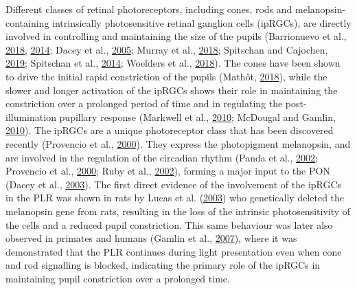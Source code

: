 \documentclass[
]{article}
\begin{document}
Different classes of retinal photoreceptors, including cones, rods and melanopsin-containing intrinsically photosensitive retinal ganglion cells (ipRGCs), are directly involved in controlling and maintaining the size of the pupils (Barrionuevo et al., \protect\hyperlink{ref-Barrionuevo2018}{2018}, \protect\hyperlink{ref-Barrionuevo2014}{2014}; Dacey et al., \protect\hyperlink{ref-Dacey2005}{2005}; Murray et al., \protect\hyperlink{ref-Murray2018}{2018}; Spitschan and Cajochen, \protect\hyperlink{ref-Spitschan2019}{2019}; Spitschan et al., \protect\hyperlink{ref-Spitschan2014}{2014}; Woelders et al., \protect\hyperlink{ref-Woelders2018}{2018}). The cones have been shown to drive the initial rapid constriction of the pupils (Mathôt, \protect\hyperlink{ref-Mathot2018}{2018}), while the slower and longer activation of the ipRGCs shows their role in maintaining the constriction over a prolonged period of time and in regulating the post-illumination pupillary response (Markwell et al., \protect\hyperlink{ref-Markwell2010}{2010}; McDougal and Gamlin, \protect\hyperlink{ref-McDougal2010}{2010}). The ipRGCs are a unique photoreceptor class that has been discovered recently (Provencio et al., \protect\hyperlink{ref-Provencio2000}{2000}). They express the photopigment melanopsin, and are involved in the regulation of the circadian rhythm (Panda et al., \protect\hyperlink{ref-Panda2002}{2002}; Provencio et al., \protect\hyperlink{ref-Provencio2000}{2000}; Ruby et al., \protect\hyperlink{ref-Ruby2002}{2002}), forming a major input to the PON (Dacey et al., \protect\hyperlink{ref-Dacey2003}{2003}). The first direct evidence of the involvement of the ipRGCs in the PLR was shown in rats by Lucas et al. (\protect\hyperlink{ref-Lucas2003}{2003}) who genetically deleted the melanopsin gene from rats, resulting in the loss of the intrinsic photosensitivity of the cells and a reduced pupil constriction. This same behaviour was later also observed in primates and humans (Gamlin et al., \protect\hyperlink{ref-Gamlin2007}{2007}), where it was demonstrated that the PLR continues during light presentation even when cone and rod signalling is blocked, indicating the primary role of the ipRGCs in maintaining pupil constriction over a prolonged time.
\end{document}
